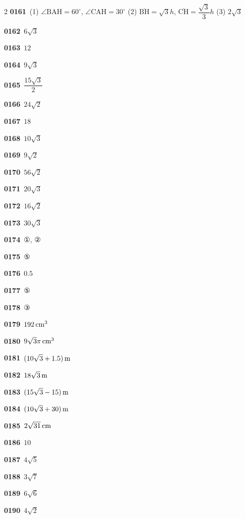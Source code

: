 \documentclass[10pt,a4paper]{article}
\newcommand{\pt}[1]{\mathrm{#1}}
\newcommand{\seg}[1]{\overline{\mathrm{#1}}}
\begin{document}
\begin{multicols}{2}
\noindent\textbf{0161}\ (1) $\angle\pt{BAH}=60^\circ$, $\angle\pt{CAH}=30^\circ$ (2) $\seg{BH}=\sqrt{3}h$, $\seg{CH}=\dfrac{\sqrt{3}}{3}h$ (3) $2\sqrt{3}$\par
\noindent\textbf{0162}\ $6\sqrt{3}$\par
\noindent\textbf{0163}\ $12$\par
\noindent\textbf{0164}\ $9\sqrt{3}$\par
\noindent\textbf{0165}\ $\dfrac{15\sqrt{3}}{2}$\par
\noindent\textbf{0166}\ $24\sqrt{2}$\par
\noindent\textbf{0167}\ $18$\par
\noindent\textbf{0168}\ $10\sqrt{3}$\par
\noindent\textbf{0169}\ $9\sqrt{2}$\par
\noindent\textbf{0170}\ $56\sqrt{2}$\par
\noindent\textbf{0171}\ $20\sqrt{3}$\par
\noindent\textbf{0172}\ $16\sqrt{2}$\par
\noindent\textbf{0173}\ $30\sqrt{3}$\par
\noindent\textbf{0174}\ ①, ②\par
\noindent\textbf{0175}\ ⑤\par
\noindent\textbf{0176}\ $0.5$\par
\noindent\textbf{0177}\ ⑤\par
\noindent\textbf{0178}\ ③\par
\noindent\textbf{0179}\ $192\mkern3mu \mathrm{cm}^3$\par
\noindent\textbf{0180}\ $9\sqrt{3}\pi\mkern3mu \mathrm{cm}^3$\par
\noindent\textbf{0181}\ $(10\sqrt{3}+1.5)\mkern3mu \mathrm{m}$\par
\noindent\textbf{0182}\ $18\sqrt{3}\mkern3mu \mathrm{m}$\par
\noindent\textbf{0183}\ $(15\sqrt{3}-15)\mkern3mu \mathrm{m}$\par
\noindent\textbf{0184}\ $(10\sqrt{3}+30)\mkern3mu \mathrm{m}$\par
\noindent\textbf{0185}\ $2\sqrt{31}\mkern3mu \mathrm{cm}$\par
\noindent\textbf{0186}\ $10$\par
\noindent\textbf{0187}\ $4\sqrt{5}$\par
\noindent\textbf{0188}\ $3\sqrt{7}$\par
\noindent\textbf{0189}\ $6\sqrt{6}$\par
\noindent\textbf{0190}\ $4\sqrt{2}$\par

\end{multicols}
\end{document}

